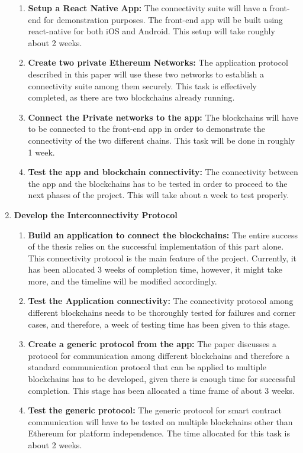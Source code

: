 \documentclass[a4paper,twoside,phd]{BYUPhys}
\begin{document}
\begin{enumerate}
    \begin{enumerate}
        \item \textbf{Setup a React Native App:} The connectivity suite will have a front-end for
        demonstration purposes. The front-end app will be built using react-native for both
        iOS and Android. This setup will take roughly about 2 weeks.
        \item \textbf{Create two private Ethereum Networks:} The application protocol described in this paper will use these two networks to establish a connectivity suite among them securely. This task is effectively completed, as there are two blockchains already running.
        \item \textbf{Connect the Private networks to the app:} The blockchains will have to be connected to the front-end app in order to demonstrate the connectivity of the two different chains. This task will be done in roughly 1 week.
        \item \textbf{Test the app and blockchain connectivity:} The connectivity between the app and the blockchains has to be tested in order to proceed to the next phases of the project. This will take about a week to test properly.
    \end{enumerate}
    \item \textbf{Develop the Interconnectivity Protocol}
    \begin{enumerate}
        \item \textbf{Build an application to connect the blockchains:} The entire success of the thesis relies on the successful implementation of this part alone. This connectivity protocol is the main feature of the project. Currently, it has been allocated 3 weeks of completion time, however, it might take more, and the timeline will be modified accordingly.
        \item \textbf{Test the Application connectivity:} The connectivity protocol among different blockchains needs to be thoroughly tested for failures and corner cases, and therefore, a week of testing time has been given to this stage.
        \item \textbf{Create a generic protocol from the app:} The paper discusses a protocol for communication among different blockchains and therefore a standard communication protocol that can be applied to multiple blockchains has to be developed, given there is enough time for successful completion. This stage has been allocated a time frame of about 3 weeks.
        \item \textbf{Test the generic protocol:} The generic protocol for smart contract communication will have to be tested on multiple blockchains other than Ethereum for platform independence. The time allocated for this task is about 2 weeks.

\end{enumerate}
\end{enumerate}
\end{document}
